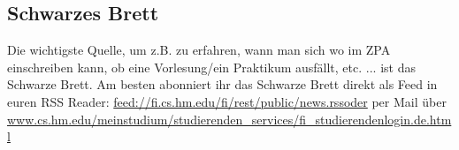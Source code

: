 \subsection{Schwarzes Brett}
Die wichtigste Quelle, um z.B. zu erfahren, wann man sich wo im ZPA 
einschreiben kann, ob eine Vorlesung/ein Praktikum ausfällt, etc. ... ist 
das Schwarze Brett. 
Am besten abonniert ihr das Schwarze Brett direkt als Feed in euren 
RSS Reader:  \url{feed://fi.cs.hm.edu/fi/rest/public/news.rssoder} 
per Mail über \url{www.cs.hm.edu/meinstudium/studierenden\_services/fi\_studierendenlogin.de.html} 